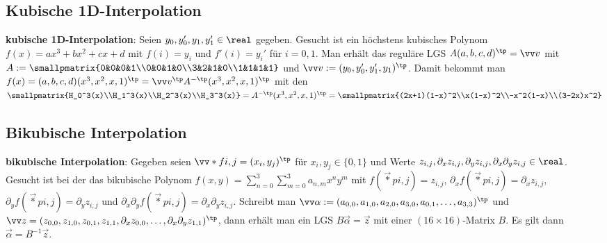 \subsection{%
    Kubische 1D-Interpolation%
}

\textbf{kubische 1D-Interpolation}:
Seien $y_0, y_0', y_1, y_1' \in \real$ gegeben.
Gesucht ist ein höchstens kubisches Polynom $f(x) = ax^3 + bx^2 + cx + d$
mit $f(i) = y_i$ und $f'(i) = y_i'$ für $i = 0, 1$.
Man erhält das reguläre LGS
$A (a, b, c, d)^\tp = \vec{v}$ mit
$A := \smallpmatrix{0&0&0&1\\0&0&1&0\\3&2&1&0\\1&1&1&1}$ und
$\vec{v} := (y_0, y_0', y_1', y_1)^\tp$.
Damit bekommt man
$f(x) = (a, b, c, d) (x^3, x^2, x, 1)^\tp
= \vec{v}^\tp A^{-\tp} (x^3, x^2, x, 1)^\tp$
mit den\\
$\smallpmatrix{H_0^3(x)\\H_1^3(x)\\H_2^3(x)\\H_3^3(x)}
= A^{-\tp} (x^3, x^2, x, 1)^\tp
= \smallpmatrix{(2x+1)(1-x)^2\\x(1-x)^2\\-x^2(1-x)\\(3-2x)x^2}$

\subsection{%
    Bikubische Interpolation%
}

\textbf{bikubische Interpolation}:
Gegeben seien $\vec*{f}{i,j} = (x_i, y_j)^\tp$ für $x_i, y_j \in \{0, 1\}$
und Werte $z_{i,j}, \partial_x z_{i,j}, \partial_y z_{i,j},
\partial_x \partial_y z_{i,j} \in \real$.
Gesucht ist bei der  das bikubische Polynom
$f(x, y) = \sum_{n=0}^3 \sum_{m=0}^3 a_{n,m} x^n y^m$ mit
$f(\vec*{p}{i,j}) = z_{i,j}$,
$\partial_x f(\vec*{p}{i,j}) = \partial_x z_{i,j}$,
$\partial_y f(\vec*{p}{i,j}) = \partial_y z_{i,j}$ und
$\partial_x \partial_y f(\vec*{p}{i,j}) = \partial_x \partial_y z_{i,j}$.
Schreibt man $\vec{\alpha} := (a_{0,0}, a_{1,0}, a_{2,0}, a_{3,0}, a_{0,1}, \dotsc, a_{3,3})^\tp$
und\\
$\vec{z} = (z_{0,0}, z_{1,0}, z_{0,1}, z_{1,1}, \partial_x z_{0,0}, \dotsc,
\partial_x \partial_y z_{1,1})^\tp$,
dann erhält man ein LGS $B\vec{\alpha} = \vec{z}$
mit einer $(16 \times 16)$-Matrix $B$.
Es gilt dann $\vec{\alpha} = B^{-1} \vec{z}$.

